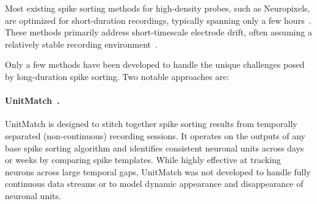 \begin{comment}


Extracting single-unit spiking activity from raw data collected over weeks and
months of continuous extracellular recordings presents significant challenges
for which there is currently no adequate solution.
%
First, neural waveforms shift gradually over days due to electrode-tissue
movement. This problems is commonly referred as electrode drift.
%
Also, neuronal firing patterns, waveforms, and recording noise evolve due to
circadian rhythms, animal state changes, and electrode aging, generating highly
non-stationary measurements.
%
Second, conventional approaches to spiking require manual curation to, for
example, decide whether to split or merge spike waveform clusters. For
long-duration recordings manual curation is impractical, and automated curation
methods become mandatory.
%
And third, hundreds of terabytes of raw data are difficult to handle on single
GPUs or single computers.


To address these challenges we will attempt a multi-faceted solution.
%
Experimentally, we will cement recording probes to the skull of mice, as
described in \citet[][supplementary discussion]{schoonoverEtAl21}, to minimise
electrode-tissue movement.
%
Statistically, we will extend existing methods and, if necessary, develop
new ones to tackle the problem of non-stationarities in neuronal measurements.
%
Computationally, spike sorting month-long neural recordings on a single computer is a
prohibitedly long process. To accelerate it we will use distributed and GPU
accelerated computing.

\end{comment}


Most existing spike sorting methods for high-density probes, such as
Neuropixels, are optimized for short-duration recordings, typically spanning
only a few hours~\citep{pachitariuEtAl24,chungEtAl17,ygerEtAl18}. These methods
primarily address short-timescale electrode drift, often assuming a relatively
stable recording environment~\citep{steinmetzEtAl21}.

Only a few methods have been developed to handle the unique challenges posed by
long-duration spike sorting. Two notable approaches are:

\paragraph{UnitMatch~\citep{vanBeestEtAl24}.}  
UnitMatch is designed to stitch together spike sorting results from temporally
separated (non-continuous) recording sessions. It operates on the outputs of
any base spike sorting algorithm and identifies consistent neuronal units
across days or weeks by comparing spike templates. While highly effective at
tracking neurons across large temporal gaps, UnitMatch was not developed to
handle fully continuous data streams or to model dynamic appearance and
disappearance of neuronal units.

